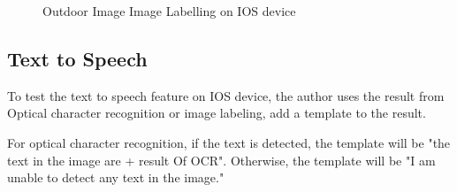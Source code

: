 \documentclass[11pt]{ucscthesis}
\begin{document}
\begin{figure}
  \hfill
\caption{Outdoor Image Image Labelling on IOS device}
\label{LabelingoutdoorIOS}
\end{figure}



\subsection{Text to Speech}
To test the text to speech feature on IOS device, the author uses the result from Optical character recognition or image labeling, add a template to the result.

For optical character recognition, if the text is detected, the template will be "the text in the image are + result Of OCR". Otherwise, the template will be "I am unable to detect any text in the image."
\end{document}

